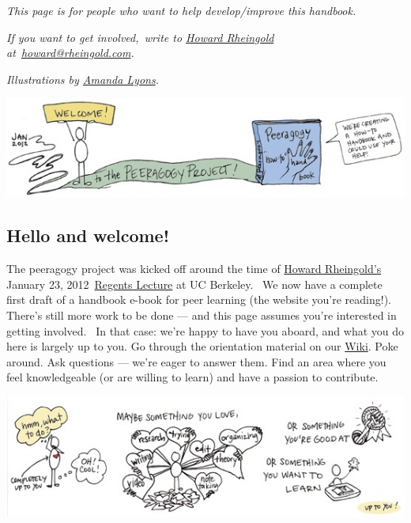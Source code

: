 \emph{This page is for people who want to help develop/improve this
handbook.}

\emph{If you want to get involved,~write to
\href{http://en.wikipedia.org/wiki/Howard\_Rheingold}{Howard Rheingold}
at~\href{mailto:howard@rheingold.com}{howard@rheingold.com}.}

\emph{Illustrations by \href{http://www.visualsforchange.com/}{Amanda
Lyons}.}

\begin{center}
\href{http://peeragogy.org/wp-content/uploads/2012/03/welcome\_color.gif}{\includegraphics[width=.9\textwidth]{../pictures/welcome_color.jpg}}
\end{center}

\subsection{Hello and welcome!}

The peeragogy project was kicked off around the time of
\href{http://rheingold.com/}{Howard Rheingold's} January 23,
2012~\href{http://vimeo.com/35685124}{Regents Lecture} at UC Berkeley.~
We now have a complete first draft of a handbook e-book for peer
learning (the website you're reading!). There's still more work to be
done --- and this page assumes you're interested in getting involved.~
In that case: we're happy to have you aboard, and what you do here is
largely up to you. Go through the orientation material on our
\href{http://socialmediaclassroom.com/host/peeragogy}{Wiki}. Poke
around. Ask questions --- we're eager to answer them. Find an area where
you feel knowledgeable (or are willing to learn) and have a passion to
contribute.

\begin{center}
\href{http://peeragogy.org/wp-content/uploads/2012/03/what\_to\_do\_color.gif}{\includegraphics[width=.9\textwidth]{../pictures/what_to_do_color.jpg}}
\end{center}

